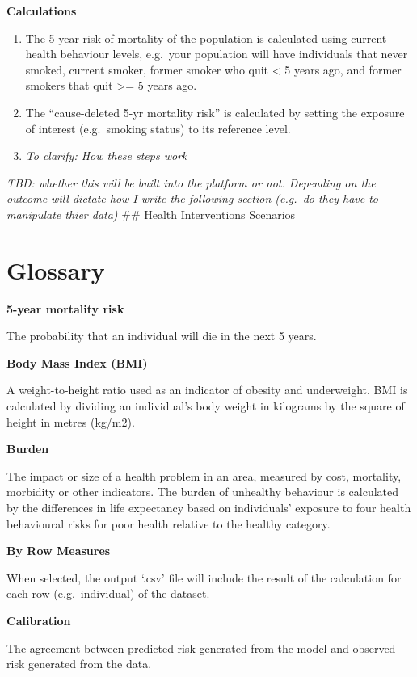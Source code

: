 \documentclass[]{book}
\begin{document}
\textbf{Calculations}

\begin{enumerate}
\def\labelenumi{\arabic{enumi})}
\item
  The 5-year risk of mortality of the population is calculated using
  current health behaviour levels, e.g.~your population will have
  individuals that never smoked, current smoker, former smoker who quit
  \textless{} 5 years ago, and former smokers that quit \textgreater{}=
  5 years ago.
\item
  The ``cause-deleted 5-yr mortality risk'' is calculated by setting the
  exposure of interest (e.g.~smoking status) to its reference level.
\item
  \emph{To clarify: How these steps work}
\end{enumerate}

\emph{TBD: whether this will be built into the platform or not.
Depending on the outcome will dictate how I write the following section
(e.g.~do they have to manipulate thier data)} \#\# Health Interventions
Scenarios

\chapter{Glossary}\label{glossary}

\textbf{5-year mortality risk}

The probability that an individual will die in the next 5 years.

\textbf{Body Mass Index (BMI)}

A weight-to-height ratio used as an indicator of obesity and
underweight. BMI is calculated by dividing an individual's body weight
in kilograms by the square of height in metres (kg/m2).

\textbf{Burden}

The impact or size of a health problem in an area, measured by cost,
mortality, morbidity or other indicators. The burden of unhealthy
behaviour is calculated by the differences in life expectancy based on
individuals' exposure to four health behavioural risks for poor health
relative to the healthy category.

\textbf{By Row Measures}

When selected, the output `.csv' file will include the result of the
calculation for each row (e.g.~individual) of the dataset.

\textbf{Calibration}

The agreement between predicted risk generated from the model and
observed risk generated from the data.
\end{document}
